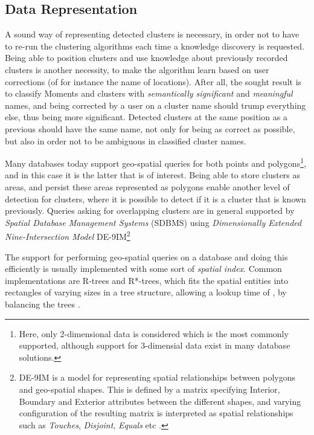 \subsection{Data Representation}
A sound way of representing detected clusters is necessary, in 
order not to have to re-run the clustering algorithms each 
time a knowledge discovery is requested. Being able to position 
clusters and use knowledge about previously recorded clusters is
another necessity, to make the algorithm learn based on user
corrections (of for instance the name of locations). 
After all, the sought result is to classify Moments
and clusters with \emph{semantically significant} and
\emph{meaningful} names, and 
being corrected by a user on a cluster name should trump 
everything else, thus being more significant. Detected clusters
at the same position as a previous should have the same name, not
only for being as correct as possible, but also in order 
not to be ambiguous in classified cluster names. 

Many databases today support geo-spatial queries for both points and
polygons\footnote{
    Here, only 2-dimensional data is considered which is the most 
    commonly supported, although support for 3-dimensial data exist
    in many database solutions.
}, and in this case it is the latter that is of interest. 
Being able to store clusters as areas, and persist these areas 
represented as polygons enable another level of detection for 
clusters, where it is possible to detect if it is a cluster that 
is known previously. Queries asking for overlapping clusters are
in general supported by 
\emph{Spatial Database Management Systems} (SDBMS) using 
\emph{Dimensionally Extended Nine-Intersection Model} 
DE-9IM\footnote{
    DE-9IM is a model for representing spatial relationships 
    between polygons and geo-spatial shapes. This is defined
    by a matrix specifying Interior, Boundary and Exterior 
    attributes between the different shapes, and varying 
    configuration of the resulting matrix is interpreted as
    spatial relationships such as \emph{Touches}, \emph{Disjoint},
    \emph{Equals} etc \cite{DE-9IM}. }

The support for performing geo-spatial queries on a database and 
doing this efficiently is usually implemented with some sort of 
\emph{spatial index}. Common implementations are R-trees 
and R*-trees, which fits the spatial entities into rectangles of
varying sizes in a tree structure, allowing a lookup time of 
, by balancing the trees \cite{R-trees, R*-trees}.

